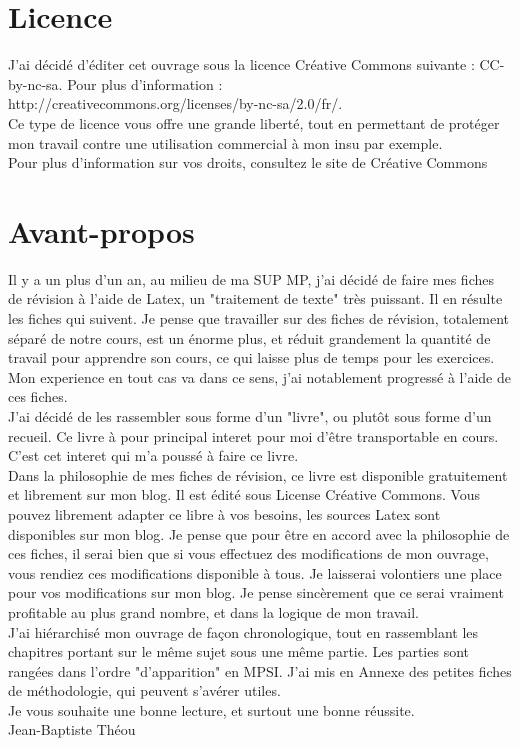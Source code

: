 \documentclass[a4paper, titlepage,twoside]{book}
\begin{document}
\pagestyle{empty}
\titleGMPHY
\clearpage
\frontmatter                  %
\chapter{Licence}
J'ai décidé d'éditer cet ouvrage sous la licence Créative Commons suivante : CC-by-nc-sa. Pour plus d'information :\\
http://creativecommons.org/licenses/by-nc-sa/2.0/fr/.\\
Ce type de licence vous offre une grande liberté, tout en permettant de protéger mon travail contre une utilisation commercial à mon insu par exemple.\\
Pour plus d'information sur vos droits, consultez le site de Créative Commons
\chapter{Avant-propos}
Il y a un plus d'un an, au milieu de ma SUP MP, j'ai décidé de faire mes fiches de révision à l'aide de Latex, un "traitement de texte" très puissant. Il en résulte les fiches qui suivent. Je pense que travailler sur des fiches de révision, totalement séparé de notre cours, est un énorme plus, et réduit grandement la quantité de travail pour apprendre son cours, ce qui laisse plus de temps pour les exercices. Mon experience en tout cas va dans ce sens, j'ai notablement progressé à l'aide de ces fiches.\\
J'ai décidé de les rassembler sous forme d'un "livre", ou plutôt sous forme d'un recueil. Ce livre à pour principal interet pour moi d'être transportable en cours. C'est cet interet qui m'a poussé à faire ce livre.\\
Dans la philosophie de mes fiches de révision, ce livre est disponible gratuitement et librement sur mon blog. Il est édité sous License Créative Commons. Vous pouvez librement adapter ce libre à vos besoins, les sources Latex sont disponibles sur mon blog. Je pense que pour être en accord avec la philosophie de ces fiches, il serai bien que si vous effectuez des modifications de mon ouvrage, vous rendiez ces modifications disponible à tous. Je laisserai volontiers une place pour vos modifications sur mon blog. Je pense sincèrement que ce serai vraiment profitable au plus grand nombre, et dans la logique de mon travail.\\
J'ai hiérarchisé mon ouvrage de façon chronologique, tout en rassemblant les chapitres portant sur le même sujet sous une même partie. Les parties sont rangées dans l'ordre "d'apparition" en MPSI. J'ai mis en Annexe des petites fiches de méthodologie, qui peuvent s'avérer utiles.\\
Je vous souhaite une bonne lecture, et surtout une bonne réussite.\\
Jean-Baptiste Théou
\end{document}
